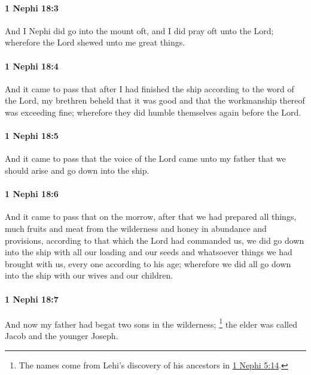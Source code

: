 		\paragraph{1 Nephi 18:3} %
			\label{1NEPHI-18-3}

			And I Nephi did go into the mount oft,
			and I did pray oft unto the Lord;
			wherefore the Lord shewed unto me great things.

		\paragraph{1 Nephi 18:4} %
			\label{1NEPHI-18-4}

			And it came to pass that after I had finished the ship
			according to the word of the Lord,
			my brethren beheld that it was good
			and that the workmanship thereof was exceeding fine;
			wherefore they did humble themselves again before the Lord.

		\paragraph{1 Nephi 18:5} %
			\label{1NEPHI-18-5}

			And it came to pass that the voice of the Lord came unto my father
			that we should arise and go down into the ship.

		\paragraph{1 Nephi 18:6} %
			\label{1NEPHI-18-6}

			And it came to pass that on the morrow,
			after that we had prepared all things,
			much fruits and meat from the wilderness
			and honey in abundance and provisions,
			according to that which the Lord had commanded us,
			we did go down into the ship with all our loading and our seeds
			and whatsoever things we had brought with us,
			every one according to his age;
			wherefore we did all go down into the ship with our wives and our children.

		\paragraph{1 Nephi 18:7} %
			\label{1NEPHI-18-7}

			And now my father had begat two sons in the wilderness;
				\footnote{%
					The names come from Lehi's discovery of his ancestors in \hyperref[1NEPHI-5-14]{1 Nephi 5:14}.
					}%
			the elder was called Jacob and the younger Joseph.

